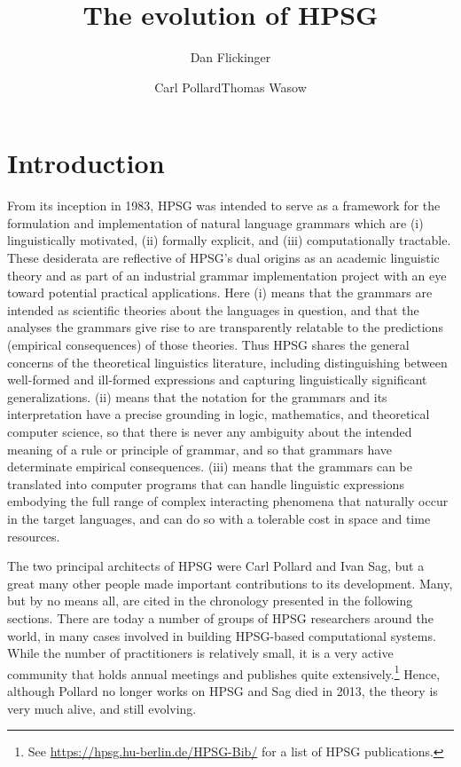 \documentclass[output=paper,biblatex,babelshorthands,newtxmath,draftmode,colorlinks,citecolor=brown]{langscibook}
\title{The evolution of HPSG}
\author{Dan Flickinger\affiliation{Stanford University}\and Carl Pollard\affiliation{Ohio State Universitiy}\lastand Thomas Wasow\affiliation{Stanford University}}
\begin{document}
\maketitle
\label{chap-evolution}


\section{Introduction} 

From its inception in 1983, HPSG was intended to serve as a framework for the formulation and implementation of natural language grammars which are (i) linguistically motivated, (ii) formally explicit, and (iii) computationally tractable. These desiderata are reflective of HPSG's dual origins as an academic linguistic theory and as part of an industrial grammar implementation project with an eye toward potential practical applications. Here (i) means that the grammars are intended as scientific theories about the languages in question, and that the analyses the grammars give rise to are transparently relatable to the predictions (empirical consequences) of those theories. Thus HPSG shares the general concerns of the theoretical linguistics literature, including distinguishing between well-formed and ill-formed expressions and capturing linguistically significant generalizations.  (ii) means that the notation for the grammars and its interpretation have a precise grounding in logic, mathematics, and theoretical computer science, so that there is never any ambiguity about the intended meaning of a rule or principle of grammar, and so that grammars have determinate empirical consequences. (iii) means that the grammars can be translated into computer programs that can handle linguistic expressions embodying the full range of complex interacting phenomena that naturally occur in the target languages, and can do so with a tolerable cost in space and time resources.

The two principal architects of HPSG were Carl Pollard and Ivan
Sag, but a great many other people made important contributions to its
development.  Many, but by no means all, are cited in the chronology presented in the following
sections.  There are today a number of groups of HPSG researchers around the world, in many cases
involved in building HPSG-based computational systems.  While the number of practitioners is
relatively small, it is a very active community that holds annual meetings and publishes quite
extensively.\footnote{See \url{https://hpsg.hu-berlin.de/HPSG-Bib/} for a list of HPSG
    publications.} Hence, although Pollard no longer works on HPSG and Sag died in 2013, the theory
is very much alive, and still evolving.
\end{document}
